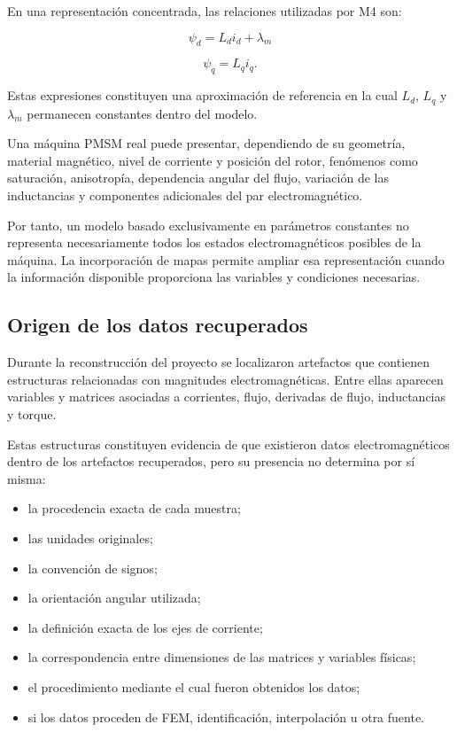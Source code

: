 En una representación concentrada, las relaciones utilizadas por M4 son:

\begin{equation}
\psi_d=L_di_d+\lambda_m
\end{equation}

\begin{equation}
\psi_q=L_qi_q.
\end{equation}

Estas expresiones constituyen una aproximación de referencia en la cual $L_d$, $L_q$ y $\lambda_m$ permanecen constantes dentro del modelo.

Una máquina PMSM real puede presentar, dependiendo de su geometría, material magnético, nivel de corriente y posición del rotor, fenómenos como saturación, anisotropía, dependencia angular del flujo, variación de las inductancias y componentes adicionales del par electromagnético.

Por tanto, un modelo basado exclusivamente en parámetros constantes no representa necesariamente todos los estados electromagnéticos posibles de la máquina. La incorporación de mapas permite ampliar esa representación cuando la información disponible proporciona las variables y condiciones necesarias.

\subsection{Origen de los datos recuperados}

Durante la reconstrucción del proyecto se localizaron artefactos que contienen estructuras relacionadas con magnitudes electromagnéticas. Entre ellas aparecen variables y matrices asociadas a corrientes, flujo, derivadas de flujo, inductancias y torque.

Estas estructuras constituyen evidencia de que existieron datos electromagnéticos dentro de los artefactos recuperados, pero su presencia no determina por sí misma:

\begin{itemize}
\item la procedencia exacta de cada muestra;
\item las unidades originales;
\item la convención de signos;
\item la orientación angular utilizada;
\item la definición exacta de los ejes de corriente;
\item la correspondencia entre dimensiones de las matrices y variables físicas;
\item el procedimiento mediante el cual fueron obtenidos los datos;
\item si los datos proceden de FEM, identificación, interpolación u otra fuente.
\end{itemize}

